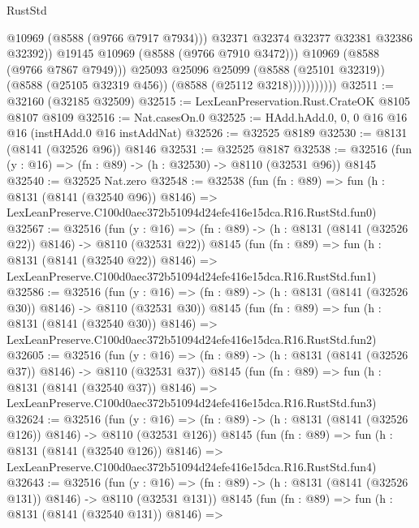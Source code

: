 \begin{lexlean}{RustStd}
\begin{coremodule}
                                @10969
                                (@8588 (@9766 @7917 @7934)))
                              @32371
                              @32374
                              @32377
                              @32381
                              @32386
                              @32392))
                          @19145
                          @10969
                          (@8588 (@9766 @7910 @3472)))
                        @10969
                        (@8588 (@9766 @7867 @7949)))
                      @25093
                      @25096
                      @25099
                      (@8588 (@25101 @32319))
                      (@8588 (@25105 @32319 @456))
                      (@8588 (@25112 @3218)))))))))))
@32511 := @32160 (@32185 @32509)
@32515 := LexLeanPreservation.Rust.CrateOK @8105 @8107 @8109
@32516 := Nat.casesOn.{0}
@32525 := HAdd.hAdd.{0, 0, 0} @16 @16 @16 (instHAdd.{0} @16 instAddNat)
@32526 := @32525 @8189
@32530 := @8131 (@8141 (@32526 @96)) @8146
@32531 := @32525 @8187
@32538 := @32516 (fun (y : @16) => (fn : @89) -> (h : @32530) -> @8110 (@32531 @96)) @8145
@32540 := @32525 Nat.zero
@32548 := @32538
    (fun (fn : @89) =>
    fun (h : @8131 (@8141 (@32540 @96)) @8146) =>
    LexLeanPreserve.C100d0aec372b51094d24efe416e15dca.R16.RustStd.fun0)
@32567 := @32516
    (fun (y : @16) => (fn : @89) -> (h : @8131 (@8141 (@32526 @22)) @8146) -> @8110 (@32531 @22))
    @8145
    (fun (fn : @89) =>
    fun (h : @8131 (@8141 (@32540 @22)) @8146) =>
    LexLeanPreserve.C100d0aec372b51094d24efe416e15dca.R16.RustStd.fun1)
@32586 := @32516
    (fun (y : @16) => (fn : @89) -> (h : @8131 (@8141 (@32526 @30)) @8146) -> @8110 (@32531 @30))
    @8145
    (fun (fn : @89) =>
    fun (h : @8131 (@8141 (@32540 @30)) @8146) =>
    LexLeanPreserve.C100d0aec372b51094d24efe416e15dca.R16.RustStd.fun2)
@32605 := @32516
    (fun (y : @16) => (fn : @89) -> (h : @8131 (@8141 (@32526 @37)) @8146) -> @8110 (@32531 @37))
    @8145
    (fun (fn : @89) =>
    fun (h : @8131 (@8141 (@32540 @37)) @8146) =>
    LexLeanPreserve.C100d0aec372b51094d24efe416e15dca.R16.RustStd.fun3)
@32624 := @32516
    (fun (y : @16) => (fn : @89) -> (h : @8131 (@8141 (@32526 @126)) @8146) -> @8110 (@32531 @126))
    @8145
    (fun (fn : @89) =>
    fun (h : @8131 (@8141 (@32540 @126)) @8146) =>
    LexLeanPreserve.C100d0aec372b51094d24efe416e15dca.R16.RustStd.fun4)
@32643 := @32516
    (fun (y : @16) => (fn : @89) -> (h : @8131 (@8141 (@32526 @131)) @8146) -> @8110 (@32531 @131))
    @8145
    (fun (fn : @89) =>
    fun (h : @8131 (@8141 (@32540 @131)) @8146) =>

\end{coremodule}
\end{lexlean}
